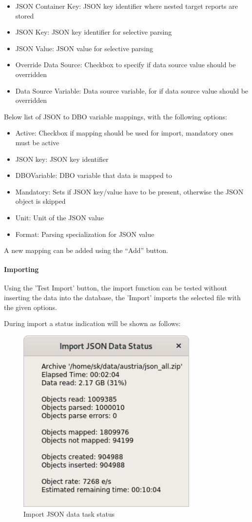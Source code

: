 {\begin{itemize}  
\item JSON Container Key: JSON key identifier where nested target reports are stored
\item JSON Key: JSON key identifier for selective parsing
\item JSON Value: JSON value for selective parsing
\item Override Data Source: Checkbox to specify if data source value should be overridden
\item Data Source Variable: Data source variable, for if data source value should be overridden
\end{itemize}


Below list of JSON to DBO variable mappings, with the following options:

\begin{itemize}  
\item Active: Checkbox if mapping should be used for import, mandatory ones must be active
\item JSON key: JSON key identifier
\item DBOVariable: DBO variable that data is mapped to
\item Mandatory: Sets if JSON key/value have to be present, otherwise the JSON object is skipped
\item Unit: Unit of the JSON value
\item Format: Parsing specialization for JSON value
\end{itemize}

A new mapping can be added using the ``Add'' button.

\paragraph{Importing}
Using the 'Test Import' button, the import function can be tested without inserting the data into the database, the 'Import' imports the selected file with the given options.

During import a status indication will be shown as follows:

\begin{figure}[H]
  \center
    \includegraphics[width=9cm,frame]{../screenshots/json_import_status.png}
  \caption{Import JSON data task status}
\end{figure}

}

